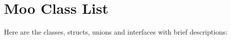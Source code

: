\section{Moo Class List}
Here are the classes, structs, unions and interfaces with brief descriptions:\begin{CompactList}
\item{}
\end{CompactList}
